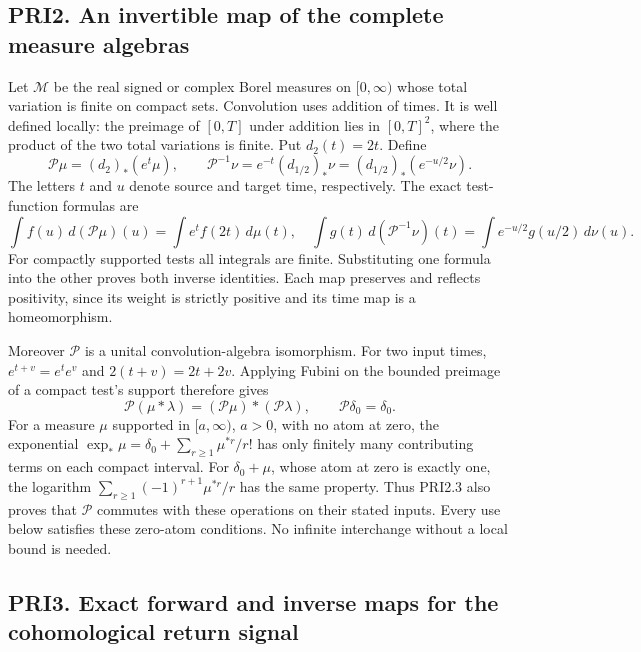 \documentclass[
]{article}
\begin{document}
\subsection{PRI2. An invertible map of the complete measure
algebras}\label{pri2.-an-invertible-map-of-the-complete-measure-algebras}

Let \(\mathscr M\) be the real signed or complex Borel measures on
\([0,\infty)\) whose total variation is finite on compact sets.
Convolution uses addition of times. It is well defined locally: the
preimage of \([0,T]\) under addition lies in \([0,T]^2\), where the
product of the two total variations is finite. Put \(d_2(t)=2t\). Define
\[
\mathscr P\mu=(d_2)_*(e^t\mu),\qquad
\mathscr P^{-1}\nu=e^{-t}(d_{1/2})_*\nu
=(d_{1/2})_*(e^{-u/2}\nu).
\tag{PRI2.1}
\] The letters \(t\) and \(u\) denote source and target time,
respectively. The exact test-function formulas are \[
\int f(u)\,d(\mathscr P\mu)(u)=\int e^tf(2t)\,d\mu(t),
\quad
\int g(t)\,d(\mathscr P^{-1}\nu)(t)
=\int e^{-u/2}g(u/2)\,d\nu(u).
\tag{PRI2.2}
\] For compactly supported tests all integrals are finite. Substituting
one formula into the other proves both inverse identities. Each map
preserves and reflects positivity, since its weight is strictly positive
and its time map is a homeomorphism.

Moreover \(\mathscr P\) is a unital convolution-algebra isomorphism. For
two input times, \(e^{t+v}=e^te^v\) and \(2(t+v)=2t+2v\). Applying
Fubini on the bounded preimage of a compact test's support therefore
gives \[
\mathscr P(\mu*\lambda)=(\mathscr P\mu)*(\mathscr P\lambda),
\qquad\mathscr P\delta_0=\delta_0.
\tag{PRI2.3}
\] For a measure \(\mu\) supported in \([a,\infty)\), \(a>0\), with no
atom at zero, the exponential
\(\exp_*\mu=\delta_0+\sum_{r\ge1}\mu^{*r}/r!\) has only finitely many
contributing terms on each compact interval. For \(\delta_0+\mu\), whose
atom at zero is exactly one, the logarithm
\(\sum_{r\ge1}(-1)^{r+1}\mu^{*r}/r\) has the same property. Thus PRI2.3
also proves that \(\mathscr P\) commutes with these operations on their
stated inputs. Every use below satisfies these zero-atom conditions. No
infinite interchange without a local bound is needed.

\subsection{PRI3. Exact forward and inverse maps for the cohomological
return
signal}\label{pri3.-exact-forward-and-inverse-maps-for-the-cohomological-return-signal}
\end{document}
